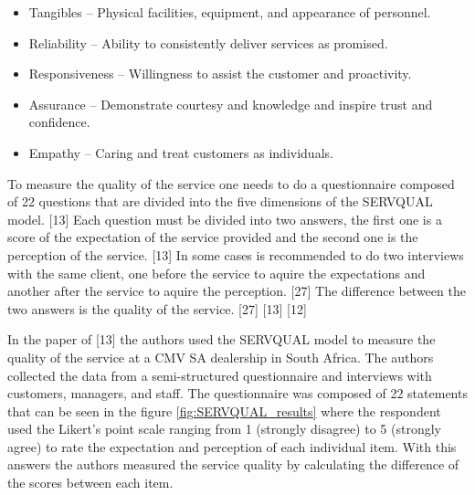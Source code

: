 \begin{itemize}
  \item Tangibles – Physical facilities, equipment, and appearance of personnel.
  \item Reliability – Ability to consistently deliver services as promised.
  \item Responsiveness – Willingness to assist the customer and proactivity.
  \item Assurance – Demonstrate courtesy and knowledge and inspire trust and confidence.
  \item Empathy – Caring and treat customers as individuals.
\end{itemize}

To measure the quality of the service one needs to do a questionnaire composed of 22 questions that are divided into the five dimensions of the SERVQUAL model. [13]
Each question must be divided into two answers, the first one is a score of the expectation of the service provided and the second one is the perception of the service. [13]
In some cases is recommended to do two interviews with the same client, one before the service to aquire the expectations and another after the service to aquire the perception. [27]
The difference between the two answers is the quality of the service. [27] [13] [12]

In the paper of [13] the authors used the SERVQUAL model to measure the quality of the service at a CMV SA dealership in South Africa.
The authors collected the data from a semi-structured questionnaire and interviews with customers, managers, and staff.
The questionnaire was composed of 22 statements that can be seen in the figure \ref{fig:SERVQUAL_results} where the respondent used the Likert’s point scale ranging from 1 (strongly disagree) to 5 (strongly agree) to rate the expectation and perception of each individual item.
With this answers the authors measured the service quality by calculating the difference of the scores between each item.
 
